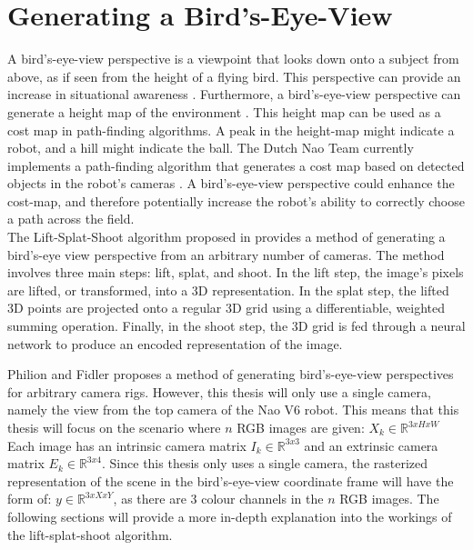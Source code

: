 \documentclass{uva-inf-bachelor-thesis}
\begin{document}
     \section{Generating a Bird's-Eye-View}
        A bird's-eye-view perspective is a viewpoint that looks down onto a subject from above, as if seen from the height of a flying bird. This perspective can provide an increase in situational awareness \cite{sitaware}.
        Furthermore, a bird's-eye-view perspective can generate a height map of the environment \cite{liftsplatshoot}. This height map can be used as a cost map in path-finding algorithms. A peak in the height-map might indicate a robot, and a hill might indicate the ball. The Dutch Nao Team currently implements a path-finding algorithm that generates a cost map based on detected objects in the robot's cameras \cite{rogier}. A bird's-eye-view perspective could enhance the cost-map, and therefore potentially increase the robot's ability to correctly choose a path across the field.   
        \hfill \break \\
        The Lift-Splat-Shoot algorithm proposed in \cite{liftsplatshoot} provides a method of generating a bird's-eye view perspective from an arbitrary number of cameras.
        The method involves three main steps: lift, splat, and shoot. In the lift step, the image's pixels are lifted, or transformed, into a 3D representation. In the splat step, the lifted 3D points are projected onto a regular 3D grid using a differentiable, weighted summing operation. Finally, in the shoot step, the 3D grid is fed through a neural network to produce an encoded representation of the image.
        
        Philion and Fidler \cite{liftsplatshoot} proposes a method of generating bird's-eye-view perspectives for arbitrary camera rigs. However, this thesis will only use a single camera, namely the view from the top camera of the Nao V6 robot. This means that this thesis will focus on the scenario where $n$ RGB images are given: ${X_k \in \mathbb{R}^{3 x H x W}}$ Each image has an intrinsic camera matrix $I_k \in \mathbb{R}^{3 x 3}$ and an extrinsic camera matrix $E_k \in \mathbb{R}^{3 x 4}$. Since this thesis only uses a single camera, the rasterized representation of the scene in the bird's-eye-view coordinate frame will have the form of: $y \in \mathbb{R}^{3 x X x Y}$, as there are 3 colour channels in the $n$ RGB images.
        The following sections will provide a more in-depth explanation into the workings of the lift-splat-shoot algorithm.
\end{document}
